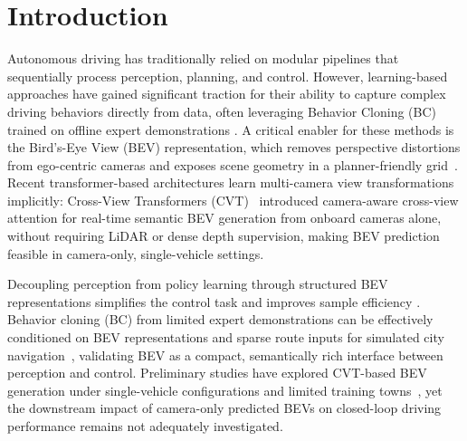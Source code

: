 \documentclass[12pt]{article}
\begin{document}
\section{Introduction}

Autonomous driving has traditionally relied on modular pipelines that sequentially process perception, planning, and control. However, learning-based approaches have gained significant traction for their ability to capture complex driving behaviors directly from data, often leveraging Behavior Cloning (BC) trained on offline expert demonstrations \cite{nvidiabc,chauffernet,codevilla2018endtoend}. A critical enabler for these methods is the Bird's-Eye View (BEV) representation, which removes perspective distortions from ego-centric cameras and exposes scene geometry in a planner-friendly grid~\cite{philion2020lss}. Recent transformer-based architectures learn multi-camera view transformations implicitly: Cross-View Transformers (CVT)~\cite{park2023cvt} introduced camera-aware cross-view attention for real-time semantic BEV generation from onboard cameras alone, without requiring LiDAR or dense depth supervision, making BEV prediction feasible in camera-only, single-vehicle settings.

Decoupling perception from policy learning through structured BEV representations simplifies the control task and improves sample efficiency \cite{resnet_rl,Couto2023}. Behavior cloning (BC) from limited expert demonstrations can be effectively conditioned on BEV representations and sparse route inputs for simulated city navigation~\cite{antonelo2024investigating}, validating BEV as a compact, semantically rich interface between perception and control. Preliminary studies have explored CVT-based BEV generation under single-vehicle configurations and limited training towns~\cite{santos2025initial}, yet the downstream impact of camera-only predicted BEVs on closed-loop driving performance remains not adequately investigated.
\end{document}
